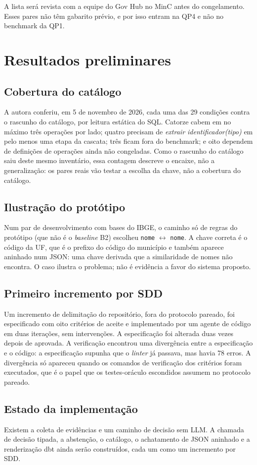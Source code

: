A lista será revista com a equipe do Gov Hub no MinC antes do congelamento.
Esses pares não têm gabarito prévio, e por isso entram na QP4 e não no
benchmark da QP1.

\section{Resultados preliminares}
\label{sec:estudodecaso-preliminares}

\subsection{Cobertura do catálogo}

A autora conferiu, em 5 de novembro de 2026, cada uma das 29 condições contra
o rascunho do catálogo, por leitura estática do SQL. Catorze cabem em no
máximo três operações por lado; quatro precisam de \emph{extrair
identificador(tipo)} em pelo menos uma etapa da cascata; três ficam fora do
benchmark; e oito dependem de definições de operações ainda não congeladas.
Como o rascunho do catálogo saiu deste mesmo inventário, essa contagem
descreve o encaixe, não a generalização: os pares reais vão testar a escolha
da chave, não a cobertura do catálogo.

\subsection{Ilustração do protótipo}

Num par de desenvolvimento com bases do IBGE, o caminho só de regras do
protótipo (que não é o \emph{baseline} B2) escolheu \texttt{nome}
$\leftrightarrow$ \texttt{nome}. A chave correta é o código da UF, que é o
prefixo do código do município e também aparece aninhado num JSON: uma chave
derivada que a similaridade de nomes não encontra. O caso ilustra o problema;
não é evidência a favor do sistema proposto.

\subsection{Primeiro incremento por SDD}

Um incremento de delimitação do repositório, fora do protocolo pareado, foi
especificado com oito critérios de aceite e implementado por um agente de
código em duas iterações, sem intervenções. A especificação foi alterada duas
vezes depois de aprovada. A verificação encontrou uma divergência entre a
especificação e o código: a especificação supunha que o \emph{linter} já
passava, mas havia 78 erros. A divergência só apareceu quando os comandos de
verificação dos critérios foram executados, que é o papel que os
testes-oráculo escondidos assumem no protocolo pareado.

\subsection{Estado da implementação}

Existem a coleta de evidências e um caminho de decisão sem LLM. A chamada de
decisão tipada, a abstenção, o catálogo, o achatamento de JSON aninhado e a
renderização dbt ainda serão construídos, cada um como um incremento por SDD.

